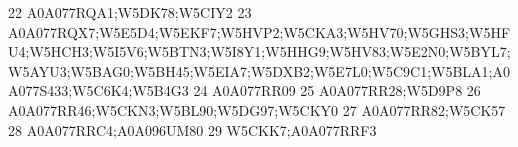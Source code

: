 \documentclass{beamer}
\begin{document}
\begin{frame}[fragile]
\begin{itemize}
\begin{Schunk}
\begin{Soutput}
22                                                                                                                                                                                                                                                                                                                                                       A0A077RQA1;W5DK78;W5CIY2
23                                                                                                                                                                           A0A077RQX7;W5E5D4;W5EKF7;W5HVP2;W5CKA3;W5HV70;W5GHS3;W5HFU4;W5HCH3;W5I5V6;W5BTN3;W5I8Y1;W5HHG9;W5HV83;W5E2N0;W5BYL7;W5AYU3;W5BAG0;W5BH45;W5EIA7;W5DXB2;W5E7L0;W5C9C1;W5BLA1;A0A077S433;W5C6K4;W5B4G3
24                                                                                                                                                                                                                                                                                                                                                                     A0A077RR09
25                                                                                                                                                                                                                                                                                                                                                              A0A077RR28;W5D9P8
26                                                                                                                                                                                                                                                                                                                                         A0A077RR46;W5CKN3;W5BL90;W5DG97;W5CKY0
27                                                                                                                                                                                                                                                                                                                                                              A0A077RR82;W5CK57
28                                                                                                                                                                                                                                                                                                                                                          A0A077RRC4;A0A096UM80
29                                                                                                                                                                                                                                                                                                                                                              W5CKK7;A0A077RRF3

\end{Soutput}
\end{Schunk}
\end{itemize}
\end{frame}
\end{document}
